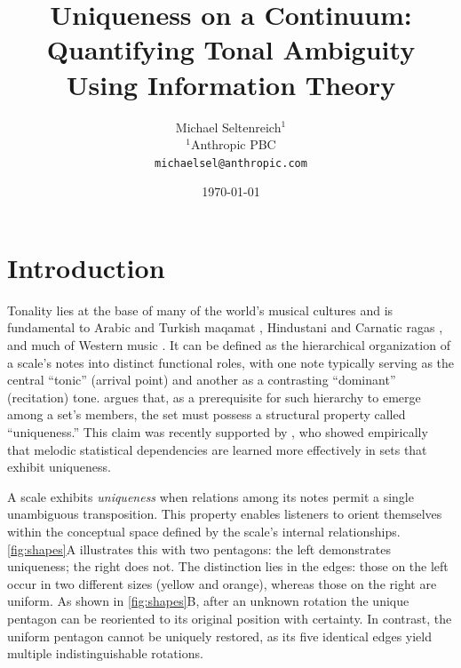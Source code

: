 \documentclass[10pt,twocolumn]{article}
\date{\today}
\title{Uniqueness on a Continuum: Quantifying Tonal Ambiguity Using Information Theory}
\author{Michael Seltenreich$^{1}$\\[4pt]
\small $^{1}$Anthropic PBC\\
\small \texttt{michaelsel@anthropic.com}
}
\numberwithin{equation}{section} %
\begin{document}

    \section{Introduction}\label{sec:intro}

    Tonality lies at the base of many of the world's musical cultures and is fundamental to Arabic and Turkish maqamat \citep{Farraj2019,Signell2008}, Hindustani and Carnatic ragas \citep{Castellano1984}, and much of Western music \citep{KrumhanslKeil1982}.
    It can be defined as the hierarchical organization of a scale's notes into distinct functional roles, with one note typically serving as the central “tonic” (arrival point) and another as a contrasting “dominant” (recitation) tone.
    \citet{Balzano1982} argues that, as a prerequisite for such hierarchy to emerge among a set’s members, the set must possess a structural property called “uniqueness.”
    This claim was recently supported by \citet{Pelofi2021}, who showed empirically that melodic statistical dependencies are learned more effectively in sets that exhibit uniqueness.

    A scale exhibits \textit{uniqueness} when relations among its notes permit a single unambiguous transposition.
    This property enables listeners to orient themselves within the conceptual space defined by the scale’s internal relationships.
    \autoref{fig:shapes}A illustrates this with two pentagons: the left demonstrates uniqueness; the right does not.
    The distinction lies in the edges: those on the left occur in two different sizes (yellow and orange), whereas those on the right are uniform.
    As shown in \autoref{fig:shapes}B, after an unknown rotation the unique pentagon can be reoriented to its original position with certainty.
    In contrast, the uniform pentagon cannot be uniquely restored, as its five identical edges yield multiple indistinguishable rotations.
\end{document}
